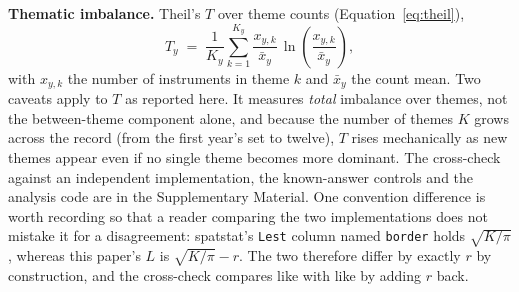 \documentclass{article}
\begin{document}
\noindent\textbf{Thematic imbalance.} Theil's $T$ \cite{theil1967economics,barabesi2026theil}
over theme counts (Equation~\eqref{eq:theil}),
\begin{equation}
T_y \;=\; \frac{1}{K_y}\sum_{k=1}^{K_y} \frac{x_{y,k}}{\bar{x}_y}\,
\ln\!\left(\frac{x_{y,k}}{\bar{x}_y}\right),
\label{eq:theil}
\end{equation}
with $x_{y,k}$ the number of instruments in theme $k$ and $\bar{x}_y$ the count mean.
Two caveats apply to $T$ as
reported here. It measures \emph{total} imbalance over themes, not the between-theme
component alone, and because the number of themes $K$ grows across the record (from
the first year's set to twelve), $T$ rises mechanically as new themes appear even if
no single theme becomes more dominant. The cross-check against an independent
implementation, the known-answer controls and the analysis code are in the Supplementary
Material. One convention difference is worth recording so that a reader comparing the two
implementations does not mistake it for a disagreement: \textsf{spatstat}'s \texttt{Lest}
column named \texttt{border} holds $\sqrt{K/\pi}$, whereas this paper's $L$ is
$\sqrt{K/\pi} - r$. The two therefore differ by exactly $r$ by construction, and the
cross-check compares like with like by adding $r$ back.
\end{document}
